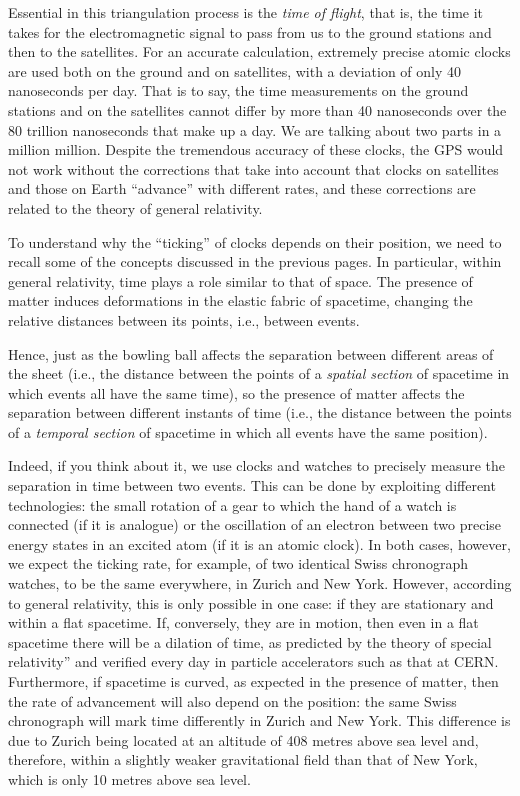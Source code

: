 Essential in this triangulation process is the \emph{time of flight}, that is, the time
it takes for the electromagnetic signal to pass from us to the ground stations and then
to the satellites. For an accurate calculation, extremely precise
atomic clocks are used both on the ground and on satellites, with a
deviation of only 40 nanoseconds per day. That is to say, the time measurements on the
ground stations and on the satellites cannot differ by more than 40 nanoseconds over the
80 trillion nanoseconds that make up a day. We are talking about two parts in a million
million. Despite the tremendous accuracy of these clocks, the GPS would not work without
the corrections that take into account that clocks on satellites and those on Earth
``advance'' with different rates, and these corrections are related to the theory of
general relativity.

To understand why the ``ticking'' of clocks depends on their position, we need to recall
some of the concepts discussed in the previous pages. In particular, within general
relativity, time plays a role similar to that of space. The presence of matter induces
deformations in the elastic fabric of spacetime, changing the relative distances between
its points, i.e., between events.

Hence, just as the bowling ball affects the separation between different areas of the
sheet (i.e., the distance between the points of a \emph{spatial
section} of spacetime in which events all have the same time), so the
presence of matter affects the separation between different instants of time (i.e., the
distance between the points of a \emph{temporal section} of spacetime
in which all events have the same position).

Indeed, if you think about it, we use clocks and watches to precisely measure the
separation in time between two events. This can be done by exploiting different
technologies: the small rotation of a gear to which the hand of a watch is connected (if
it is analogue) or the oscillation of an electron between two precise energy states in
an excited atom (if it is an atomic clock). In both cases, however, we expect the
ticking rate, for example, of two identical Swiss chronograph watches, to be the same
everywhere, in Zurich and New York. However, according to general relativity, this is
only possible in one case: if they are stationary and within a flat spacetime. If,
conversely, they are in motion, then even in a flat spacetime there will be a
dilation of time, as predicted by the theory of special
relativity'' and verified every day in particle accelerators such as
that at CERN. Furthermore, if spacetime is curved, as expected in the
presence of matter, then the rate of advancement will also depend on the position: the
same Swiss chronograph will mark time differently in Zurich and New York. This
difference is due to Zurich being located at an altitude of 408 metres above sea level
and, therefore, within a slightly weaker gravitational field than that of New York,
which is only 10 metres above sea level.

